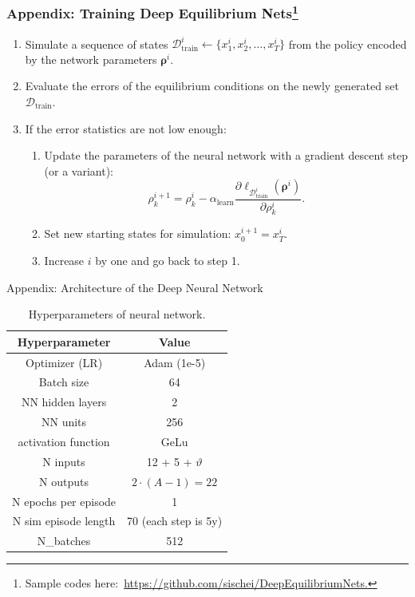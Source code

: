 \documentclass[10pt,aspectratio=169]{beamer}
\begin{document}
\begin{frame}
\frametitle{Appendix: Training Deep Equilibrium Nets\footnote{Sample codes here:~\url{https://github.com/sischei/DeepEquilibriumNets.}}}
\begin{enumerate}
\item Simulate a sequence of states $\mathcal{D}_{\text{train}}^i\gets\{x^i_1, x^i_2, \dots ,x^i_T\}$  from the policy encoded by the network parameters $\bm{\rho}^i$.
\item Evaluate the errors of the equilibrium conditions on the newly generated set $\mathcal{D}_{\text{train}}$.
\item If the error statistics are not low enough:
\begin{enumerate}
\item Update the parameters of the neural network with a gradient descent step (or a variant):
  \begin{equation}
  \rho^{i+1}_{k}=\rho^{i}_{k} - \alpha_{\text{learn}} \frac{\partial \ell_{\mathcal{D}_{\text{train}}^i}(\bm{\rho}^{i})}{\partial \rho^i_{k}} \nonumber.
  \end{equation}
  \item Set new starting states for simulation: $x^{i+1}_0 = x^i_T$.
  \item Increase $i$ by one and go back to step 1.
\end{enumerate}
\end{enumerate}
\end{frame}

\begin{frame}[fragile]{Appendix: Architecture of the Deep Neural Network}
    \begin{table}[h]
    \centering
    \begin{tabular}{|c|c|}
    \hline
    \textbf{Hyperparameter} & \textbf{Value} \\
    \hline
    Optimizer (LR) & Adam (1e-5) \\
    Batch size & 64 \\
    NN hidden layers & 2 \\
    NN units & 256  \\
    activation function & GeLu \\
    N inputs & 12 + 5 + $\vartheta$ \\
    N outputs & $2\cdot(A-1) = 22$ \\
    N epochs per episode & 1 \\
    N sim episode length & 70 (each step is 5y) \\
    N\_batches & 512 \\
    \hline
    \end{tabular}
    \caption{Hyperparameters of neural network.}
    \label{tab:nn_arch}
\end{table}
\end{frame}
\end{document}
